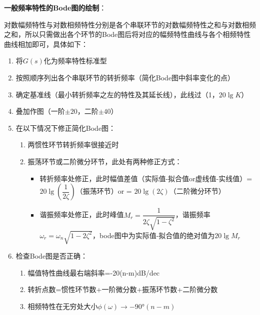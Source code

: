 \textbf{一般频率特性的Bode图的绘制}：

对数幅频特性与对数相频特性分别是各个串联环节的对数幅频特性之和与对数相频之和，所以只需做出各个环节的Bode图后将对应的幅频特性曲线与各个相频特性曲线相加即可，具体如下：
\begin{enumerate}
    \item 将$G(s)$化为频率特性标准型
    \item 按照顺序列出各个串联环节的转折频率（简化Bode图中斜率变化的点）
    \item 确定基准线（最小转折频率之左的特性及其延长线），此线过（1，$20\lg K$）
    \item 叠加作图（一阶$\pm 20$，二阶$\pm 40$）
    \item 在以下情况下修正简化Bode图：
    \begin{enumerate}
        \item 两惯性环节转折频率很接近时
        \item 振荡环节或二阶微分环节，此处有两种修正方式：
        \begin{itemize}
            \item 转折频率处修正，此时幅值差值（实际值-拟合值or虚线值-实线值）=$20\lg(\dfrac{1}{2\zeta})$（振荡环节）or = $20\lg(2\zeta)$（二阶微分环节）
            \item 谐振频率处修正，此时峰值$M_r = \dfrac{1}{2\zeta\sqrt{1-\zeta^2}}$，谐振频率$\omega_r = \omega_n\sqrt{1-2\zeta^2}$，bode图中为实际值-拟合值的绝对值为$20\lg M_r$
        \end{itemize}
    \end{enumerate}
    \item 检查Bode图是否正确：
    \begin{enumerate}
        \item 幅值特性曲线最右端斜率=-20(n-m)dB/dec
        \item 转折点数=惯性环节数+一阶微分数+振荡环节数+二阶微分数
        \item 相频特性在无穷处大小$\phi(\omega)\to -90\text{°}(n-m)$
    \end{enumerate}
\end{enumerate}